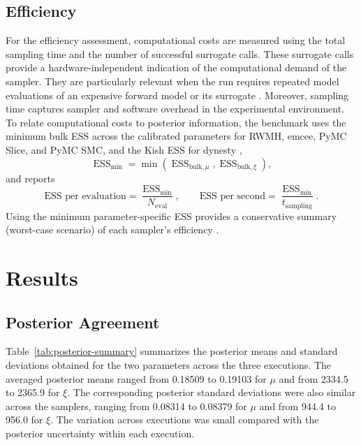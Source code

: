 \subsection{Efficiency}
For the efficiency assessment, computational costs are measured using the total sampling time and the number of successful surrogate calls. These surrogate calls provide a hardware-independent indication of the computational demand of the sampler. They are particularly relevant when the run requires repeated model evaluations of an expensive forward model or its surrogate \autocite{Yildiz2023}. Moreover, sampling time captures sampler and software overhead in the experimental environment. To relate computational costs to posterior information, the benchmark uses the minimum bulk ESS across the calibrated parameters for RWMH, emcee, PyMC Slice, and PyMC SMC, and the Kish ESS for dynesty \autocite{DynestyDocs2026},
\[
    \operatorname{ESS}_{\min}
    =
    \min\!\left(
        \operatorname{ESS}_{\mathrm{bulk},\mu},
        \operatorname{ESS}_{\mathrm{bulk},\xi}
    \right),
\]
and reports
\[
    \text{ESS per evaluation}
    =
    \frac{\operatorname{ESS}_{\min}}{N_{\mathrm{eval}}},
    \qquad
    \text{ESS per second}
    =
    \frac{\operatorname{ESS}_{\min}}{t_{\mathrm{sampling}}}.
\]
Using the minimum parameter-specific ESS provides a conservative summary (worst-case scenario) of each sampler's efficiency \autocite{Albert2025}.

\section{Results}
\label{sec:eval-results}

\subsection{Posterior Agreement}

Table~\ref{tab:posterior-summary} summarizes the posterior means and standard deviations obtained for the two parameters across the three executions. The averaged posterior means ranged from 0.18509 to 0.19103 for $\mu$ and from 2334.5 to 2365.9 for $\xi$. The corresponding posterior standard deviations were also similar across the samplers, ranging from 0.08314 to 0.08379 for $\mu$ and from 944.4 to 956.0 for $\xi$. The variation across executions was small compared with the posterior uncertainty within each execution.

